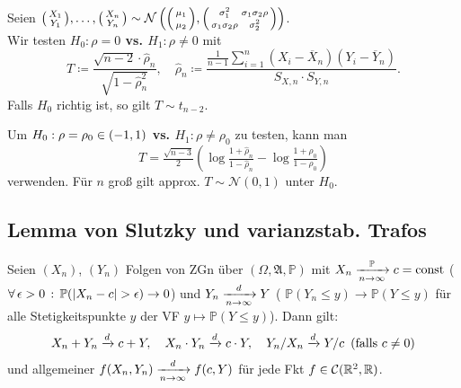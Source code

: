 \documentclass{cheat-sheet}
\newcommand{\Alg}{\mathfrak{A}} %
\renewcommand{\P}{\mathbb{P}} %
\newcommand{\Cont}{\mathcal{C}} %
\newcommand{\testh}[1]{\textcolor{TestColor}{\textbf{#1}}}
\newcommand{\Normal}{\mathcal{N}} %
\begin{document}
\begin{test}
  Seien $\begin{psmallmatrix} X_1 \\ Y_1 \end{psmallmatrix}, \ldots, \begin{psmallmatrix} X_n \\ Y_n \end{psmallmatrix} \sim \Normal\left(
    \begin{psmallmatrix}
      \mu_1\vphantom{\sigma_1^2} \\
      \mu_2\vphantom{\sigma_2^2}
    \end{psmallmatrix},
    \begin{psmallmatrix}
      \sigma_1^2 & \sigma_1 \sigma_2 \rho \\
      \sigma_1 \sigma_2 \rho & \sigma_2^2
    \end{psmallmatrix} \right)$. \\[2pt]
  Wir testen \testh{$H_0 : \rho = 0$ vs. $H_1 : \rho \neq 0$} mit
  \[
    T \coloneqq \frac{\sqrt{n-2} \cdot \hat{\rho}_n}{\sqrt{1 - \hat{\rho}_n^2}}, \quad
    \hat{\rho}_n \coloneqq \frac{\tfrac{1}{n-1} \sum_{i=1}^n (X_i - \overline{X}_n) (Y_i - \overline{Y}_n)}{S_{X,n} \cdot S_{Y,n}}.
  \]
  Falls $H_0$ richtig ist, so gilt $T \sim t_{n-2}$. \\[2pt]
\end{test}

\begin{bem}
  Um \testh{$H_0 : \rho = \rho_0 \in \left( -1, 1 \right)$ vs. $H_1 : \rho \neq \rho_0$} zu testen, kann man
  \[ T = \tfrac{\sqrt{n-3}}{2} \left( \log \tfrac{1 + \hat{\rho}_n}{1 - \hat{\rho}_n} - \log \tfrac{1+\rho_0}{1-\rho_0} \right) \]
  verwenden.
  Für $n$ groß gilt approx. $T \sim \Normal(0, 1)$ unter $H_0$.
\end{bem}

\subsection{Lemma von Slutzky und varianzstab. Trafos}

\begin{lem}
  Seien $(X_n)$, $(Y_n)$ Folgen von ZGn über $(\Omega, \Alg, \P)$ mit $X_n \xra[n \to \infty]{\P} c = \text{const}$ (\dh{} $\fa{\epsilon > 0} \P(\abs{X_n - c} > \epsilon) \to 0$) und $Y_n \xrightarrow[n \to \infty]{d} Y$ (\dh{} $\P(Y_n \leq y) \to \P(Y \leq y)$ für alle Stetigkeitspunkte $y$ der VF $y \mapsto \P(Y \leq y)$). Dann gilt:
  \[
    X_n + Y_n \xrightarrow{d} c + Y, \quad
    X_n \cdot Y_n \xrightarrow{d} c \cdot Y, \quad
    Y_n / X_n \xrightarrow{d} Y / c \enspace \text{(falls $c \neq 0$)}
  \]
  und allgemeiner $f(X_n, Y_n) \xrightarrow[n \to \infty]{d} f(c, Y)$ für jede Fkt $f \in \Cont(\R^2, \R)$.
\end{lem}
\end{document}
